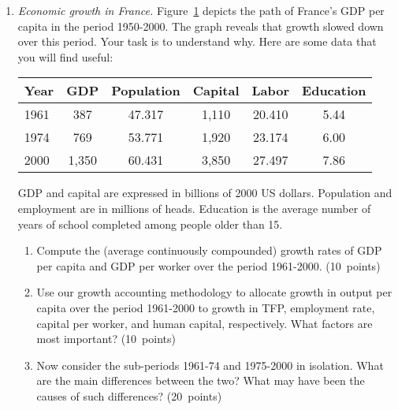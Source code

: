 \documentclass[letterpaper,12pt]{article}
\begin{document}
\bigskip
\begin{enumerate}

\begin{figure}[h]
    \centering
    \texttt{[image: france\_gdp.eps]}
    \caption{Economic Growth in France, 1950-2000.}
    \label{fig:france_gdp}
\end{figure}
%

\item {\it Economic growth in France.} Figure~\ref{fig:france_gdp}
depicts the path of France's GDP per capita in the period
1950-2000.
%
The graph reveals that growth slowed down over this period. Your
task is to understand why. Here are some data that you will find
useful:
%
\begin{center}
\begin{tabular}{lccccc}
\hline\hline
Year   &      GDP      &  Population  &  Capital    &  Labor   & Education  \\
\hline\hline
1961   &     387       &   47.317     & 1,110       & 20.410   &   5.44     \\%
1974   &     769       &   53.771     & 1,920       & 23.174   &   6.00     \\%
2000   &     1,350     &   60.431     & 3,850       & 27.497   &   7.86     \\%
\hline\hline
\end{tabular}
\end{center}
%
GDP and capital are expressed in billions of 2000 US dollars.
Population and employment are in millions of heads. Education is
the average number of years of school completed among people older
than 15.

\begin{enumerate}

\item Compute the (average continuously compounded) growth rates
of GDP per capita and GDP per worker over the period 1961-2000.
(10~points)

\item Use our growth accounting methodology to allocate growth in
output per capita over the period 1961-2000 to growth in TFP,
employment rate, capital per worker, and human capital,
respectively. What factors are most important? (10~points)

\item Now consider the sub-periods 1961-74 and 1975-2000 in
isolation. What are the main differences between the two? What may
have been the causes of such differences? (20~points)


\end{enumerate}
\end{enumerate}
\end{document}
